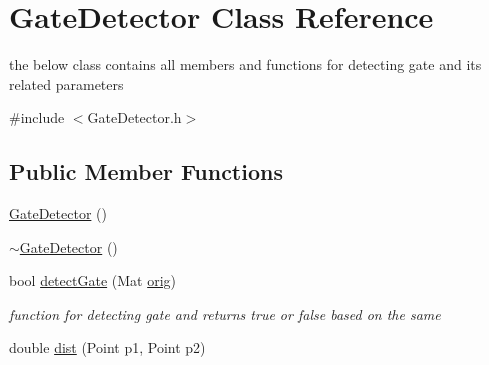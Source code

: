 \hypertarget{classGateDetector}{}\section{Gate\+Detector Class Reference}
\label{classGateDetector}


the below class contains all members and functions for detecting gate and its related parameters  




{\ttfamily \#include $<$Gate\+Detector.\+h$>$}

\subsection*{Public Member Functions}
\begin{DoxyCompactItemize}
\item 
\hyperlink{classGateDetector_a1b77579b6a41d523fe7ab9f3696050da}{Gate\+Detector} ()
\item 
\hyperlink{classGateDetector_a28bdb879e84b651f87a98085998547b4}{$\sim$\+Gate\+Detector} ()
\item 
bool \hyperlink{classGateDetector_ae854ee30952a3fb59a122d52a64b3b7a}{detect\+Gate} (Mat \hyperlink{qualification__task_8cpp_ae544386e0f095e03d639cf884b7a8a1b}{orig})
\begin{DoxyCompactList}\small\item\em function for detecting gate and returns true or false based on the same \end{DoxyCompactList}\item 
double \hyperlink{classGateDetector_acc50c293920790d445bfaea70e17b0b9}{dist} (Point p1, Point p2)
\end{DoxyCompactItemize}
